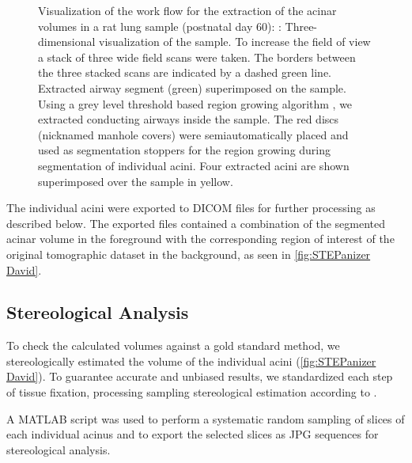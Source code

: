 \documentclass[final,paper=a4,DIV=calc,abstract,english]{scrartcl}
\newlength\imagescale		%
\begin{document}
\begin{figure}
{\begin{tikzpicture}[x=\imagescale,y=-\imagescale]
		\end{tikzpicture}%
		\label{subfig:extracted acini}%
		}%
	\caption{%
		Visualization of the work flow for the extraction of the acinar volumes in a rat lung sample (postnatal day 60): %
		\protect{}: Three-dimensional visualization of the sample.
		To increase the field of view a stack of three wide field scans were taken.
		The borders between the three stacked scans are indicated by a dashed green line.
		\protect{} Extracted airway segment (green) superimposed on the sample.
		Using a grey level threshold based region growing algorithm , we extracted conducting airways inside the sample.
		The red discs (nicknamed manhole covers) were semiautomatically placed and used as segmentation stoppers for the region growing during segmentation of individual acini.
		\protect{} Four extracted acini are shown superimposed over the sample in yellow.
	}
	\label{fig:workflow}
\end{figure}

The individual acini were exported to DICOM files for further processing as described below.
The exported files contained a combination of the segmented acinar volume in the foreground with the corresponding region of interest of the original tomographic dataset in the background, as seen in \autoref{fig:STEPanizer David}.

\subsection{Stereological Analysis}
\label{sec:stereological analysis}
To check the calculated volumes against a gold standard method, we stereologically estimated the volume of the individual acini (\autoref{fig:STEPanizer David}).
To guarantee accurate and unbiased results, we standardized each step of tissue fixation, processing  sampling stereological estimation  according to \citet{Hsia2010}.

A MATLAB\deleted[id=dh]{\textsuperscript{\textregistered}} script was used to perform a systematic random sampling of slices of each individual acinus and to export the selected slices as JPG sequences for stereological analysis.
\end{document}
